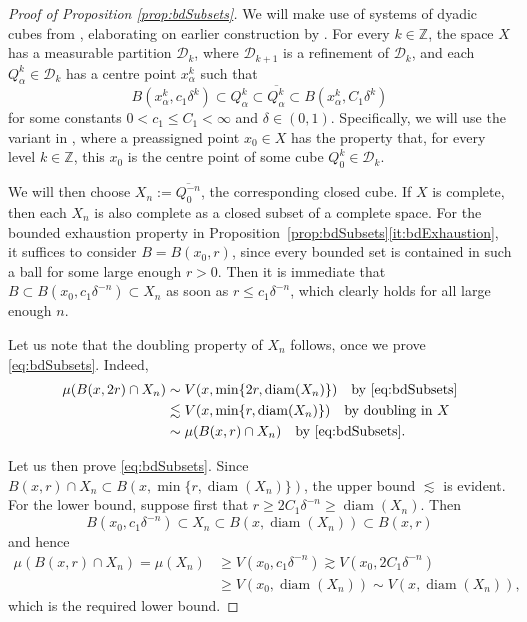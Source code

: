 \documentclass[11pt]{amsart}
\theoremstyle{definition}
\theoremstyle{remark}
\numberwithin{equation}{section}
\begin{document}
\begin{proof}[Proof of Proposition \ref{prop:bdSubsets}]
We will make use of systems of dyadic cubes from \cite{HK:cubes}, elaborating on earlier
construction by \cite{Christ:cubes}. For every $k\in\mathbb Z$, the space $X$ has a
measurable partition $\mathscr D_k$, where $\mathscr D_{k+1}$ is a refinement of $\mathscr
D_k$, and each $Q^k_\alpha\in\mathscr D_k$ has a centre point $x^k_\alpha$
 such that \cite[(2.8) and (2.15)]{HK:cubes}
\begin{equation}
  B(x^k_\alpha,c_1\delta^k)\subset Q^k_\alpha
  \subset\overline{Q^k_\alpha}\subset B(x^k_\alpha,C_1\delta^k)
\end{equation}
for some constants $0<c_1\leq C_1<\infty$ and $\delta\in(0,1)$. Specifically, we will use
the variant in \cite[Proposition 4.3]{HK:cubes}, where a preassigned point $x_0\in X$ has
the property that, for every level $k\in\mathbb Z$, this $x_0$ is the centre point of some
cube $Q^k_0\in\mathscr D_k$.

We will then choose $X_n:=\overline{Q^{-n}_0}$, the corresponding closed cube. If $X$ is
complete, then each $X_n$ is also complete as a closed subset of a complete space. For the
bounded exhaustion property in Proposition~\ref{prop:bdSubsets}\eqref{it:bdExhaustion}, it
suffices to consider $B=B(x_0,r)$, since every bounded set is contained in such a ball for
some large enough $r>0$. Then it is immediate that $B\subset B(x_0,c_1\delta^{-n})\subset
X_n$ as soon as $r\leq c_1\delta^{-n}$, which clearly holds for all large enough $n$.

Let us note that the doubling property of $X_n$ follows, once we prove \eqref{eq:bdSubsets}.
Indeed,
\begin{equation*}
\begin{split}
  \mu(B(x,2r)\cap X_n)
  &\sim V(x,\min\{2r,\operatorname{diam}(X_n)\})\quad\text{by \eqref{eq:bdSubsets}} \\
  &\lesssim V(x,\min\{r,\operatorname{diam}(X_n)\})\quad\text{by doubling in }X \\
  &\sim\mu(B(x,r)\cap X_n)\quad\text{by \eqref{eq:bdSubsets}}.
\end{split}
\end{equation*}

Let us then prove \eqref{eq:bdSubsets}. Since $B(x,r)\cap X_n\subset
B(x,\min\{r,\operatorname{diam}(X_n)\})$, the upper bound $\lesssim$ is evident. For the
lower bound, suppose first that $r\geq 2C_1\delta^{-n}\geq\operatorname{diam}(X_n)$. Then
\begin{equation*}
  B(x_0,c_1\delta^{-n})\subset X_n\subset B(x,\operatorname{diam}(X_n))\subset B(x,r)
\end{equation*}
and hence
\begin{equation*}
\begin{split}
  \mu(B(x,r)\cap X_n)=\mu(X_n)
  &\geq V(x_0,c_1\delta^{-n})
  \gtrsim V(x_0, 2C_1\delta^{-n}) \\
  &\geq V(x_0,\operatorname{diam}(X_n))\sim V(x,\operatorname{diam}(X_n)),
\end{split}
\end{equation*}
which is the required lower bound.


\end{proof}
\end{document}
